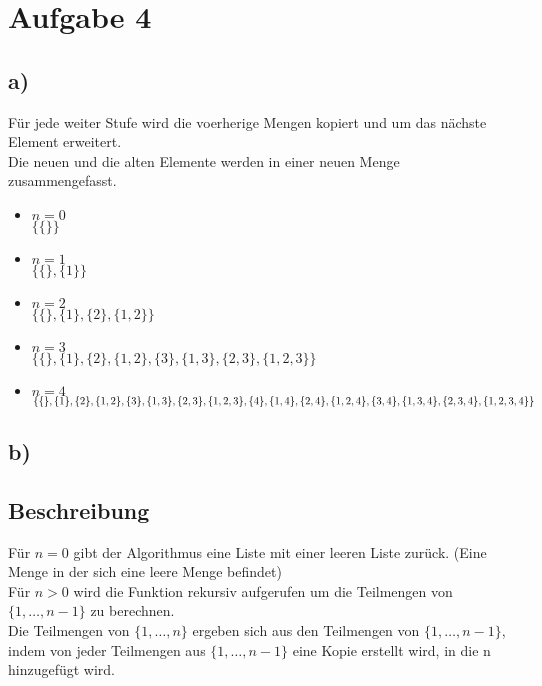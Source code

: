 \documentclass[a4paper]{scrartcl}
\begin{document}
\newpage
\section*{Aufgabe 4}
\subsection*{a)}
Für jede weiter Stufe wird die voerherige Mengen kopiert und um das nächste Element erweitert.\\
Die neuen und die alten Elemente werden in einer neuen Menge zusammengefasst.\\
\begin{itemize}
    \item $n = 0$ \\
    $ \{ \{\} \} $
    \item $n = 1$ \\
    $ \{ \{\}, \{1\} \} $
    \item $n = 2$ \\
    $ \{ \{\}, \{1\}, \{2\}, \{1, 2\} \} $
    \item $n = 3$ \\
    $ \{ \{\}, \{1\}, \{2\}, \{1, 2\}, \{3\}, \{1, 3\}, \{2, 3\}, \{1, 2, 3\} \} $
    \item $n = 4$ \\
    $ \{ \{\}, \{1\}, \{2\}, \{1, 2\}, \{3\}, \{1, 3\}, \{2, 3\}, \{1, 2, 3\}, \\ \{4\}, \{1, 4\}, \{2, 4\}, \{1, 2, 4\}, \{3, 4\}, \{1, 3, 4\}, \{2, 3, 4\}, \{1, 2, 3, 4\} \} $
\end{itemize}

\subsection*{b)}
\subsection*{Beschreibung}
Für $n = 0$ gibt der Algorithmus eine Liste mit einer leeren Liste zurück. (Eine Menge in der sich eine leere Menge befindet)\\
Für $n > 0$ wird die Funktion rekursiv aufgerufen um die Teilmengen von $\{1, \ldots, n-1\}$ zu berechnen.\\
Die Teilmengen von $\{1, \ldots, n\}$ ergeben sich aus den Teilmengen von $\{1, \ldots, n-1\}$, indem von jeder Teilmengen aus $\{1, \ldots, n-1\}$ eine Kopie erstellt wird, in die n hinzugefügt wird.\\
\newpage
\end{document}
